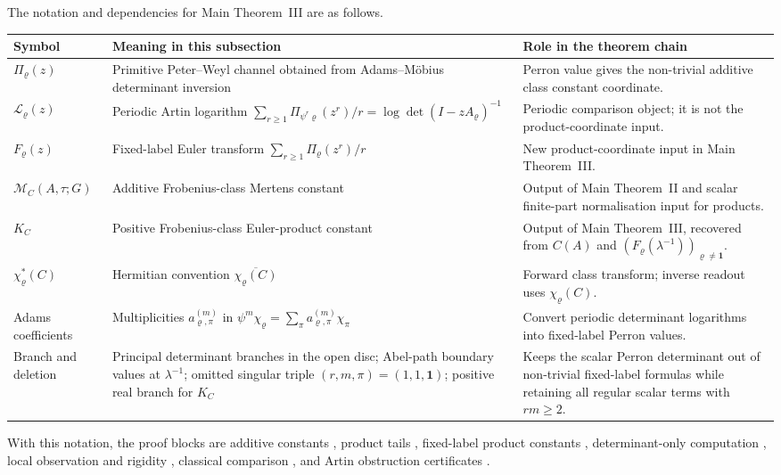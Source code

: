 \documentclass[11pt,a4paper]{amsart}
\theoremstyle{plain}
\theoremstyle{definition}
\theoremstyle{remark}
\begin{document}
The notation and dependencies for Main Theorem~III are as follows.
\begin{center}
\footnotesize
\begin{tabular}{@{}L{0.18\textwidth}L{0.40\textwidth}L{0.34\textwidth}@{}}
\toprule
Symbol & Meaning in this subsection & Role in the theorem chain \\
\midrule
\(\Pi_\varrho(z)\) & Primitive Peter--Weyl channel obtained from Adams--M\"obius determinant inversion & Perron value gives the non-trivial additive class constant coordinate. \\
\(\mathcal L_\varrho(z)\) & Periodic Artin logarithm \(\sum_{r\ge1}\Pi_{\psi^r\varrho}(z^r)/r=\log\det(I-zA_\varrho)^{-1}\) & Periodic comparison object; it is not the product-coordinate input. \\
\(F_\varrho(z)\) & Fixed-label Euler transform \(\sum_{r\ge1}\Pi_\varrho(z^r)/r\) & New product-coordinate input in Main Theorem~III. \\
\(\mathcal M_C(A,\tau;G)\) & Additive Frobenius-class Mertens constant & Output of Main Theorem~II and scalar finite-part normalisation input for products. \\
\(K_C\) & Positive Frobenius-class Euler-product constant & Output of Main Theorem~III, recovered from \(C(A)\) and \((F_\varrho(\lambda^{-1}))_{\varrho\ne\mathbf1}\). \\
\(\chi_\varrho^\ast(C)\) & Hermitian convention \(\overline{\chi_\varrho(C)}\) & Forward class transform; inverse readout uses \(\chi_\varrho(C)\). \\
Adams coefficients & Multiplicities \(a_{\varrho,\pi}^{(m)}\) in \(\psi^m\chi_\varrho=\sum_\pi a_{\varrho,\pi}^{(m)}\chi_\pi\) & Convert periodic determinant logarithms into fixed-label Perron values. \\
Branch and deletion & Principal determinant branches in the open disc; Abel-path boundary values at \(\lambda^{-1}\); omitted singular triple \((r,m,\pi)=(1,1,\mathbf1)\); positive real branch for \(K_C\) & Keeps the scalar Perron determinant out of non-trivial fixed-label formulas while retaining all regular scalar terms with \(rm\ge2\). \\
\bottomrule
\end{tabular}
\end{center}

With this notation, the proof blocks are additive constants
, product tails
, fixed-label product constants
, determinant-only computation
, local observation and
rigidity
,
classical comparison
, and Artin
obstruction certificates .
\end{document}
